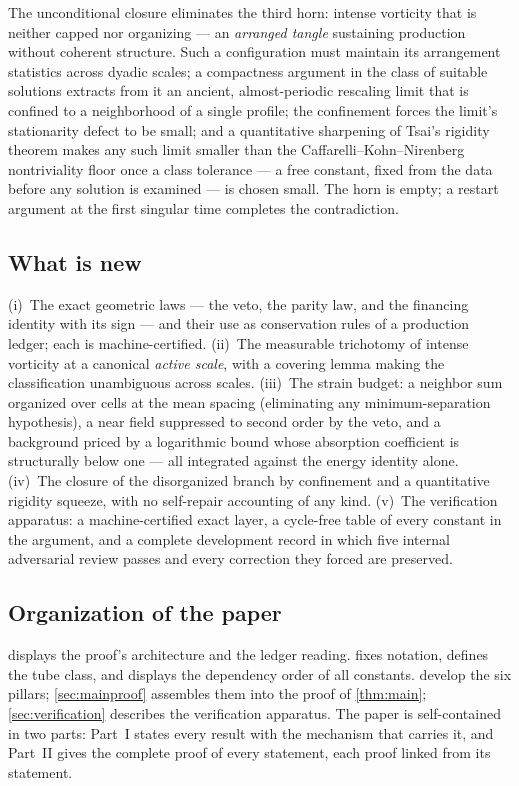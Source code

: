 \documentclass[11pt,letterpaper]{amsart}
\theoremstyle{definition}
\theoremstyle{remark}
\begin{document}
The unconditional closure eliminates the third horn: intense vorticity that is neither
capped nor organizing --- an \emph{arranged tangle} sustaining production without
coherent structure. Such a configuration must maintain its arrangement statistics
across dyadic scales; a compactness argument in the class of suitable solutions
\cite{CKN1982,LemarieRieusset2002,KikuchiSeregin2007} extracts from it an ancient,
almost-periodic rescaling limit that is confined to a neighborhood of a single
profile; the confinement forces the limit's stationarity defect to be small; and a
quantitative sharpening of Tsai's rigidity theorem \cite{Tsai1998,NRS1996} makes any
such limit smaller than the Caffarelli--Kohn--Nirenberg nontriviality floor
\cite{CKN1982,Lin1998} once a class tolerance --- a free constant, fixed from the data
before any solution is examined --- is chosen small. The horn is empty; a restart
argument at the first singular time completes the contradiction.

\subsection{What is new}\label{subsec:new}
(i)~The exact geometric laws --- the veto, the parity law, and the financing identity
with its sign --- and their use as conservation rules of a production ledger; each is
machine-certified. (ii)~The measurable trichotomy of intense vorticity at a canonical
\emph{active scale}, with a covering lemma making the classification unambiguous
across scales. (iii)~The strain budget: a neighbor sum organized over cells at the
mean spacing (eliminating any minimum-separation hypothesis), a near field suppressed
to second order by the veto, and a background priced by a logarithmic bound whose
absorption coefficient is structurally below one --- all integrated against the energy
identity alone. (iv)~The closure of the disorganized branch by confinement and a
quantitative rigidity squeeze, with no self-repair accounting of any kind. (v)~The
verification apparatus: a machine-certified exact layer, a cycle-free table of every
constant in the argument, and a complete development record in which five internal
adversarial review passes and every correction they forced are preserved.

\subsection{Organization of the paper}\label{subsec:organization}
 displays the proof's architecture and the ledger reading.
 fixes notation, defines the tube class, and displays the dependency
order of all constants. 
develop the six pillars; \cref{sec:mainproof} assembles them into the proof of
\cref{thm:main}; \cref{sec:verification} describes the verification apparatus. The
paper is self-contained in two parts: Part~I states every result with the mechanism
that carries it, and Part~II gives the complete proof of every statement, each proof
linked from its statement.
\end{document}
